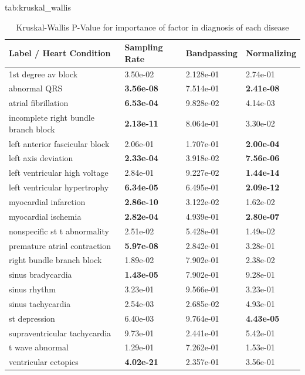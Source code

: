 \documentclass[pmlr,twocolumn]{jmlr}%
\begin{document}
\begin{table}[tbp]
\floatconts
  {tab:kruskal_wallis}
  {\caption{Kruskal-Wallis P-Value for importance of factor in diagnosis of each disease }}
  {
        \begin{tabular}{|l|l|l|l|}
        \hline
        Label / Heart Condition &             Sampling Rate & Bandpassing & Normalizing\\\hline
1st degree av block                  &  3.50e-02  & 2.128e-01 & 2.74e-01  \\
abnormal QRS                         &  \textbf{3.56e-08}  & 7.514e-01 & \textbf{2.41e-08} \\
atrial fibrillation                  &  \textbf{6.53e-04}  & 9.828e-02 & 4.14e-03   \\
incomplete right bundle branch block &  \textbf{2.13e-11}  & 8.064e-01 & 3.30e-02   \\
left anterior fascicular block       &  2.06e-01  & 1.707e-01 & \textbf{2.00e-04}    \\
left axis deviation                  &  \textbf{2.33e-04}  & 3.918e-02 & \textbf{7.56e-06}   \\
left ventricular high voltage        &  2.84e-01  & 9.227e-02 & \textbf{1.44e-14}    \\
left ventricular hypertrophy         &  \textbf{6.34e-05}  & 6.495e-01  & \textbf{2.09e-12}   \\
myocardial infarction                &  \textbf{2.86e-10}  & 3.122e-02  & 1.62e-02  \\
myocardial ischemia                  &  \textbf{2.82e-04}  & 4.939e-01  & \textbf{2.80e-07}  \\
nonspecific st t abnormality         &  2.51e-02  & 5.428e-01 & 1.49e-02  \\
premature atrial contraction         &  \textbf{5.97e-08}  & 2.842e-01 & 3.28e-01  \\
right bundle branch block            &  1.89e-02  & 7.902e-01 & 2.38e-02  \\
sinus bradycardia                    &  \textbf{1.43e-05}  & 7.902e-01 & 9.28e-01  \\
sinus rhythm                         &  3.23e-01  & 9.566e-01 & 3.23e-01  \\
sinus tachycardia                    &  2.54e-03  & 2.685e-02 & 4.93e-01 \\
st depression                        &  6.40e-03  & 9.764e-01 & \textbf{4.43e-05}  \\
supraventricular tachycardia         &  9.73e-01  & 2.441e-01 & 5.42e-01 \\
t wave abnormal                      &  1.29e-01  & 7.262e-01 & 1.53e-01  \\
ventricular ectopics                 &  \textbf{4.02e-21}  & 2.357e-01 & 3.56e-01 \\\hline
        \end{tabular}
  }
\end{table}
\end{document}
